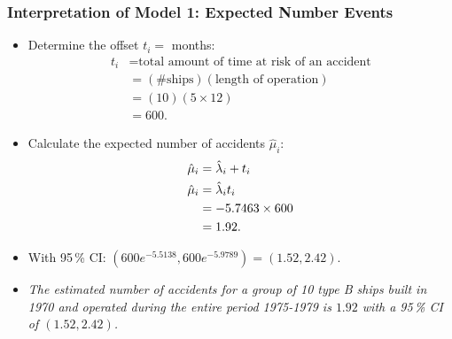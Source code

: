 \documentclass[oneside]{book}\usepackage[]{graphicx}\usepackage[svgnames]{xcolor}
\makeatletter
\newcommand{\hlnum}[1]{\textcolor[rgb]{0.686,0.059,0.569}{#1}}%
\newcommand{\hlopt}[1]{\textcolor[rgb]{0,0,0}{#1}}%
\newcommand{\hlstd}[1]{\textcolor[rgb]{0.345,0.345,0.345}{#1}}%
\newcommand{\hlkwd}[1]{\textcolor[rgb]{0.737,0.353,0.396}{\textbf{#1}}}%
\newenvironment{kframe}{%
 \def\at@end@of@kframe{}%
 \ifinner\ifhmode%
  \def\at@end@of@kframe{\end{minipage}}%
  \begin{minipage}{\columnwidth}%
 \fi\fi%
 \def\FrameCommand##1{\hskip\@totalleftmargin \hskip-\fboxsep
 \colorbox{shadecolor}{##1}\hskip-\fboxsep
     \hskip-\linewidth \hskip-\@totalleftmargin \hskip\columnwidth}%
 \MakeFramed {\advance\hsize-\width
   \@totalleftmargin\z@ \linewidth\hsize
   \@setminipage}}%
 {\par\unskip\endMakeFramed%
 \at@end@of@kframe}
\newenvironment{knitrout}{}{} %
\let\exp\relax%
\let\log\relax%
\makeatother
\begin{document}
\subsubsection*{Interpretation of Model 1: Expected Number Events}
\begin{itemize}
      \item Determine the offset $ t_i= $ months:
            \begin{align*}
                  t_i
                   & =\text{total amount of time at risk of an accident} \\
                   & =(\text{\# ships})(\text{length of operation})      \\
                   & =(10)(5\times 12)                                   \\
                   & =600.
            \end{align*}
      \item Calculate the expected number of accidents $ \hat{\mu}_i $:
            \begin{align*}
                  \log{\hat{\mu}_i}
                              & =\log{\hat{\lambda}_i}+\log{t_i} \\
                  \hat{\mu}_i & =\hat{\lambda}_i t_i             \\
                              & =\exp{-5.7463}\times 600         \\
                              & =1.92.
            \end{align*}
      \item With 95\,\% CI: $ (600 e^{-5.5138},600 e^{-5.9789})=(1.52,2.42) $.
      \item \emph{The estimated number of accidents for a group of 10 type B ships built in 1970
                  and operated during the entire period 1975-1979 is $1.92$ with a 95\,\% CI of $(1.52,2.42)$.}
\end{itemize}
\end{document}
